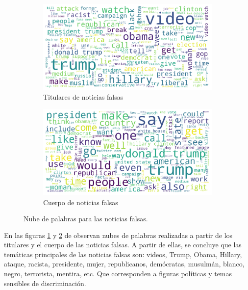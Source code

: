 {\begin{figure}
\centering
\begin{subfigure}{\escala\textwidth}
    \centering
    \includegraphics[width=\textwidth]{imagenes/wordcloud_titulares_falsas.pdf}
    \caption{Titulares de noticias falsas}
    \label{fig:tit-fake}
\end{subfigure}%
\newline
\begin{subfigure}{\escala\textwidth}
    \centering
    \includegraphics[width=\textwidth]{imagenes/wordclouds_cuerpo_falsas.pdf}
    \caption{Cuerpo de noticias falsas}
    \label{fig:text-fake}
\end{subfigure}
\caption{Nube de palabras para las noticias falsas.}
\label{fig:fake}
\end{figure}
En las figuras \ref{fig:tit-fake} y \ref{fig:text-fake} de observan nubes de palabras realizadas a partir de los titulares y el cuerpo de las noticias falsas. A partir de ellas, se concluye que las temáticas principales de las noticias falsas son: videos, Trump, Obama, Hillary, ataque, racista, presidente, mujer, republicanos, demócratas, musulmán, blanco, negro, terrorista, mentira, etc. Que corresponden a figuras políticas y temas sensibles de discriminación. 

}
